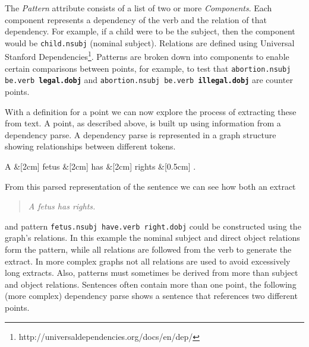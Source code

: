     The \textit{Pattern} attribute consists of a list of two or more \textit{Components}. Each component represents a dependency of the verb and the relation of that dependency. For example, if a child were to be the subject, then the component would be \texttt{child.nsubj} (nominal subject). Relations are defined using Universal Stanford Dependencies\footnote{http://universaldependencies.org/docs/en/dep/}. Patterns are broken down into components to enable certain comparisons between points, for example, to test that \texttt{abortion.nsubj be.verb \textbf{legal.dobj}} and \texttt{abortion.nsubj be.verb \textbf{illegal.dobj}} are counter points.

    With a definition for a point we can now explore the process of extracting these from text. A point, as described above, is built up using information from a dependency parse. A dependency parse is represented in a graph structure showing relationships between different tokens.

	\begin{center}
      \begin{dependency}[edge horizontal padding=0]
          \begin{deptext}
              A \&[2cm] fetus \&[2cm] has \&[2cm] rights \&[0.5cm] . \\
          \end{deptext}
      \end{dependency}
	\end{center}
    \vspace{-7mm}

    From this parsed representation of the sentence we can see how both an extract \blockquote{\textit{A fetus has rights.}} and pattern \texttt{fetus.nsubj have.verb right.dobj} could be constructed using the graph's relations. In this example the nominal subject and direct object relations form the pattern, while all relations are followed from the verb to generate the extract. In more complex graphs not all relations are used to avoid excessively long extracts. Also, patterns must sometimes be derived from more than subject and object relations. Sentences often contain more than one point, the following (more complex) dependency parse shows a sentence that references two different points.

